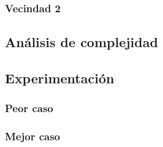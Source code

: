  


% 		
% 		
% 		
\subsubsection{Vecindad 2}

\subsection{Análisis de complejidad}






\subsection{Experimentación}


\subsubsection{Peor caso}



\subsubsection{Mejor caso}
